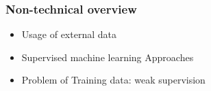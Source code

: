 

\subsubsection{Non-technical overview}

\begin{itemize}
    \item Usage of external data
    \item Supervised machine learning Approaches
    \item Problem of Training data: weak supervision
\end{itemize}




